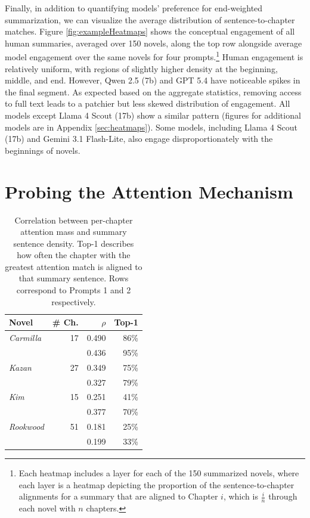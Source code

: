 \documentclass{article} %
\begin{document}
Finally, in addition to quantifying models' preference for end-weighted summarization, we can visualize the average distribution of sentence-to-chapter matches.
Figure \ref{fig:exampleHeatmaps} shows the conceptual engagement of all human summaries, averaged over 150 novels, along the top row alongside average model engagement over the same novels for four prompts.\footnote{Each heatmap includes a layer for each of the 150 summarized novels, where each layer is a heatmap depicting the proportion of the sentence-to-chapter alignments for a summary that are aligned to Chapter $i$, which is $\frac{i}{n}$ through each novel with $n$ chapters.}
Human engagement is relatively uniform, with regions of slightly higher density at the beginning, middle, and end.
However, Qwen 2.5 (7b) and GPT 5.4 have noticeable spikes in the final segment.
As expected based on the aggregate statistics, removing access to full text leads to a patchier but less skewed distribution of engagement.
All models except Llama 4 Scout (17b) show a similar pattern (figures for additional models are in Appendix \ref{sec:heatmaps}).
Some models, including Llama 4 Scout (17b) and Gemini 3.1 Flash-Lite, also engage disproportionately with the beginnings of novels.

\section{Probing the Attention Mechanism}
\begin{table}
\centering
\small
\begin{tabular}{lrrr}
  \toprule
  \textbf{Novel} & \textbf{\# Ch.} & \textbf{$\rho$} & \textbf{Top-1} \\
  \midrule
  \textit{Carmilla}  & 17 & 0.490 & 86\%\\
                      &    & 0.436 & 95\%\\
  \midrule
  \textit{Kazan}     & 27 & 0.349 & 75\%\\
                      &    & 0.327 & 79\%\\
  \midrule
  \textit{Kim}       & 15 & 0.251 & 41\%\\
                      &    & 0.377 & 70\%\\
  \midrule
  \textit{Rookwood}  & 51 & 0.181 & 25\%\\
                      &    & 0.199 & 33\%\\
  \bottomrule
\end{tabular}
\caption{Correlation between per-chapter attention mass and summary sentence density. Top-1 describes how often the chapter with the greatest attention match is aligned to that summary sentence. Rows correspond to Prompts 1 and 2 respectively.}
\label{tab:attnCorr}
\end{table}
\end{document}

